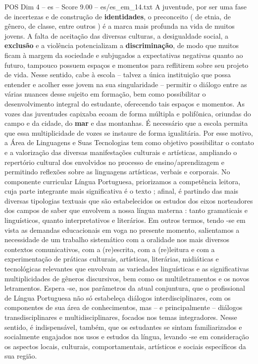 \begin{textsample}{POS Dim 4 – es – Score 9.00 – es/es\_em\_14.txt}
A juventude, por ser uma fase de incertezas e de construção de \textbf{identidades}, o preconceito ( de etnia, de gênero, de classe, entre outros ) é a marca mais profunda na vida de muitos jovens.
A falta de aceitação das diversas culturas, a desigualdade social, a \textbf{exclusão} e a violência potencializam a \textbf{discriminação}, de modo que muitos ficam à margem da sociedade e subjugados a expectativas negativas quanto ao futuro, tampouco possuem espaços e momentos para reflitirem sobre seu projeto de vida.
Nesse sentido, cabe à escola – talvez a única instituição que possa entender e acolher esse jovem na sua singularidade – permitir o diálogo entre as várias nuances desse sujeito em formação, bem como possibilitar o desenvolvimento integral do estudante, oferecendo tais espaços e momentos.
As vozes das juventudes capixaba ecoam de forma múltipla e polifônica, oriundas do campo e da cidade, do \textbf{mar} e das montanhas.
É necessário que a escola permita que essa multiplicidade de vozes se instaure de forma igualitária.
Por esse motivo, a Área de Linguagens e Suas Tecnologias tem como objetivo possibilitar o contato e a valorização das diversas manifestações culturais e artísticas, ampliando o repertório cultural dos envolvidos no processo de ensino/aprendizagem e permitindo reflexões sobre as linguagens artísticas, verbais e corporais.
No componente curricular Língua Portuguesa, priorizamos a competência leitora, cuja parte integrante mais significativa é o texto ; afinal, é partindo das mais diversas tipologias textuais que são estabelecidos os estudos dos eixos norteadores dos campos de saber que envolvem a nossa língua materna : tanto gramaticais e linguísticos, quanto interpretativos e literários.
Em outros termos, tendo -se em vista as demandas educacionais em voga no presente momento, salientamos a necessidade de um trabalho sistemático com a oralidade nos mais diversos contextos comunicativos, com a (re)escrita, com a (re)leitura e com a experimentação de práticas culturais, artísticas, literárias, midiáticas e tecnológicas relevantes que envolvam as variedades linguísticas e as significativas multiplicidades de gêneros discursivos, bem como os multiletramentos e os novos letramentos.
Espera -se, nos parâmetros da atual conjuntura, que o profissional de Língua Portuguesa não só estabeleça diálogos interdisciplinares, com os componentes de sua área de conhecimentos, mas – e principalmente – diálogos transdisciplinares e multidisciplinares, focados nos temas integradores.
Nesse sentido, é indispensável, também, que os estudantes se sintam familiarizados e socialmente engajados nos usos e estudos da língua, levando -se em consideração os aspectos locais, culturais, comportamentais, artísticos e sociais específicos da sua região.

\end{textsample}
